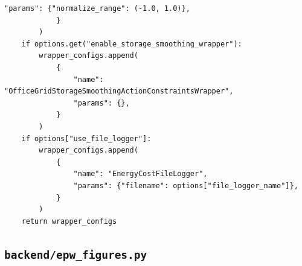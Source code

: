 \documentclass[10pt,a4paper]{article}
\begin{document}
\begin{lstlisting}[style=studioPython,caption={backend/entrenar\_agent\_wrappers.py},label={lst:backend-entrenar-agent-wrappers-py}]
                "params": {"normalize_range": (-1.0, 1.0)},
            }
        )
    if options.get("enable_storage_smoothing_wrapper"):
        wrapper_configs.append(
            {
                "name": "OfficeGridStorageSmoothingActionConstraintsWrapper",
                "params": {},
            }
        )
    if options["use_file_logger"]:
        wrapper_configs.append(
            {
                "name": "EnergyCostFileLogger",
                "params": {"filename": options["file_logger_name"]},
            }
        )
    return wrapper_configs
\end{lstlisting}


\subsection{\texorpdfstring{\texttt{backend/epw\_figures.py}}{backend/epw\_figures.py}}
\end{document}
